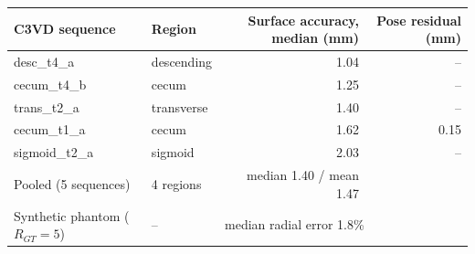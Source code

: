 \begin{tabular}{llrr}
\toprule
C3VD sequence & Region & Surface accuracy, median (mm) & Pose residual (mm) \\
\midrule
desc\_t4\_a & descending & 1.04 & -- \\
cecum\_t4\_b & cecum & 1.25 & -- \\
trans\_t2\_a & transverse & 1.40 & -- \\
cecum\_t1\_a & cecum & 1.62 & 0.15 \\
sigmoid\_t2\_a & sigmoid & 2.03 & -- \\
\midrule
Pooled (5 sequences) & 4 regions & median 1.40 / mean 1.47 & \\
Synthetic phantom ($R_{GT}=5$) & -- & \multicolumn{2}{l}{median radial error 1.8\%} \\
\bottomrule
\end{tabular}
